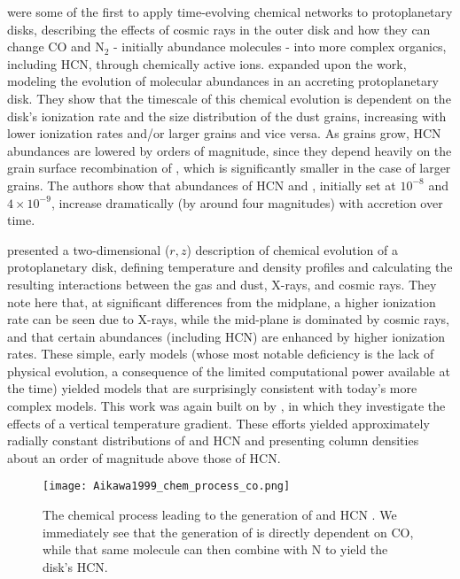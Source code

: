 
\citet{Aikawa1997} were some of the first to apply time-evolving chemical networks to protoplanetary disks, describing the effects of cosmic rays in the outer disk and how they can change CO and N$_2$ - initially abundance molecules - into more complex organics, including HCN, through chemically active ions. \citet{Aikawa1999} expanded upon the work, modeling the evolution of molecular abundances in an accreting protoplanetary disk. They show that the timescale of this chemical evolution is dependent on the disk's ionization rate and the size distribution of the dust grains, increasing with lower ionization rates and/or larger grains and vice versa. As grains grow, HCN abundances are lowered by orders of magnitude, since they depend heavily on the grain surface recombination of \hco, which is significantly smaller in the case of larger grains. The authors show that abundances of HCN and \hco, initially set at $10^{-8}$ and $4 \times 10^{-9}$, increase dramatically (by around four magnitudes) with accretion over time.

\citet{AikawaHerbst1999} presented a two-dimensional ($r, z$) description of chemical evolution of a protoplanetary disk, defining temperature and density profiles and calculating the resulting interactions between the gas and dust, X-rays, and cosmic rays. They note here that, at significant differences from the midplane, a higher ionization rate can be seen due to X-rays, while the mid-plane is dominated by cosmic rays, and that certain abundances (including HCN) are enhanced by higher ionization rates. These simple, early models (whose most notable deficiency is the lack of physical evolution, a consequence of the limited computational power available at the time) yielded models that are surprisingly consistent with today's more complex models. This work was again built on by \citet{Aikawa2002}, in which they investigate the effects of a vertical temperature gradient. These efforts yielded approximately radially constant distributions of \hco and HCN and \hco presenting column densities about an order of magnitude above those of HCN.


\begin{figure}[h]
  \texttt{[image: Aikawa1999\_chem\_process\_co.png]}%
  \caption{The chemical process leading to the generation of \hco and HCN \citep{Aikawa1999}. We immediately see that the generation of \hco is directly dependent on CO, while that same \hco molecule can then combine with N to yield the disk's HCN.}
  \label{fig:disk_ionization}
\end{figure}


